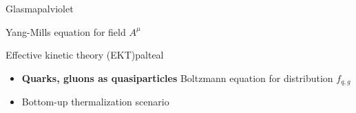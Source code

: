 \documentclass[aspectratio=169,11pt,usenames,dvipsnames]{beamer}
\begin{document}
\begin{frame}[noframenumbering]
\begin{columns}[onlytextwidth,t]
\begin{center}
\begin{custombox2}{Glasma}{palviolet}
\begin{varwidth}{0.72\textwidth}
\begin{itemize}
                        {\color{lightgray}\scriptsize Yang-Mills equation for field $A^\mu$}
                    
                \end{itemize}
                \end{varwidth}
            \end{custombox2}
            \begin{custombox2}{Effective kinetic theory (EKT)}{palteal}
                \small
                \begin{varwidth}{0.93\textwidth}
                \begin{itemize}\itemsep0em 
                    \item {\bfseries Quarks, gluons as quasiparticles}
                        {\color{lightgray}\scriptsize Boltzmann equation for distribution $f_{q,g}$}
                    \item Bottom-up thermalization scenario
                    

\end{itemize}
\end{varwidth}
\end{custombox2}
\end{center}
\end{columns}
\end{frame}
\end{document}
